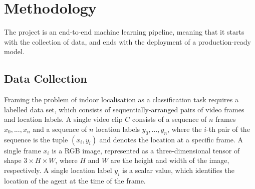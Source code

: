\documentclass{article}
\begin{document}



  \section{Methodology} %
  \label{sec:methodology}

  The project is an end-to-end machine learning pipeline, meaning that it
  starts with the collection of data, and ends with the deployment of a
  production-ready model. 

  \subsection{Data Collection} %
  \label{sub:data-collection}


  Framing the problem of indoor localisation as a classification task requires a
  labelled data set, which consists of sequentially-arranged pairs of video
  frames and location labels. A single video clip $C$ consists of a sequence of
  $n$ frames $x_0, ..., x_n$ and a sequence of $n$ location labels $y_0, ...,
  y_n$, where the $i$-th pair of the sequence is the tuple $(x_i,y_i)$ and
  denotes the location at a specific frame. A single frame $x_i$ is a RGB image,
  represented as a three-dimensional tensor of shape $3 \times H \times W$,
  where $H$ and $W$ are the height and width of the image, respectively. A
  single location label $y_i$ is a scalar value, which identifies the location
  of the agent at the time of the frame. 
\end{document}
